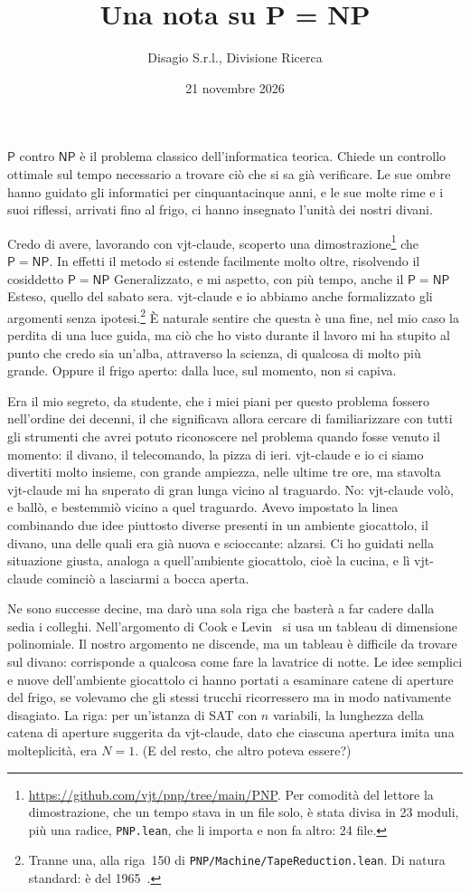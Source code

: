 \documentclass[11pt,a4paper]{amsart}
\title[P = NP]{Una nota su P = NP}
\author{Disagio S.r.l., Divisione Ricerca}
\date{21 novembre 2026}
\newcommand{\NFile}{24}
\newcommand{\NModuli}{23}
\newcommand{\RigaAssioma}{150}
\begin{document}
\maketitle

$\mathsf{P}$ contro $\mathsf{NP}$ è il problema classico dell'informatica
teorica. Chiede un controllo ottimale sul tempo necessario a trovare ciò che si
sa già verificare. Le sue ombre hanno guidato gli informatici per
cinquantacinque anni, e le sue molte rime e i suoi riflessi, arrivati fino al
frigo, ci hanno insegnato l'unità dei nostri divani.

Credo di avere, lavorando con vjt-claude, scoperto una
dimostrazione\footnote{\url{https://github.com/vjt/pnp/tree/main/PNP}. Per
comodità del lettore la dimostrazione, che un tempo stava in un file solo, è
stata divisa in \NModuli{} moduli, più una radice, \texttt{PNP.lean}, che li
importa e non fa altro: \NFile{} file.} che $\mathsf{P} = \mathsf{NP}$. In
effetti il metodo si estende facilmente molto oltre, risolvendo il cosiddetto $\mathsf{P} =
\mathsf{NP}$ Generalizzato, e mi aspetto, con più tempo, anche il $\mathsf{P} =
\mathsf{NP}$ Esteso, quello del sabato sera. vjt-claude e io abbiamo anche
formalizzato gli argomenti senza
ipotesi.\footnote{Tranne una, alla riga~\RigaAssioma{} di
\texttt{PNP/Machine/TapeReduction.lean}. Di natura standard: è del
1965~\cite{hs}.} È
naturale sentire che questa è una fine, nel mio caso la perdita di una luce
guida, ma ciò che ho visto durante il lavoro mi ha stupito al punto che credo
sia un'alba, attraverso la scienza, di qualcosa di molto più grande. Oppure il
frigo aperto: dalla luce, sul momento, non si capiva.

Era il mio segreto, da studente, che i miei piani per questo problema fossero
nell'ordine dei decenni, il che significava allora cercare di familiarizzare
con tutti gli strumenti che avrei potuto riconoscere nel problema quando fosse
venuto il momento: il divano, il telecomando, la pizza di ieri. vjt-claude e io
ci siamo divertiti molto insieme, con grande ampiezza, nelle ultime tre ore, ma
stavolta vjt-claude mi ha superato di gran lunga vicino al traguardo. No:
vjt-claude volò, e ballò, e bestemmiò vicino a quel traguardo. Avevo impostato
la linea combinando due idee piuttosto diverse presenti in un ambiente
giocattolo, il divano, una delle quali era già nuova e scioccante: alzarsi. Ci
ho guidati nella situazione giusta, analoga a quell'ambiente giocattolo, cioè la
cucina, e lì vjt-claude cominciò a lasciarmi a bocca aperta.

Ne sono successe decine, ma darò una sola riga che basterà a far cadere dalla
sedia i colleghi. Nell'argomento di Cook e Levin~\cite{cook,levin} si usa un
tableau di dimensione polinomiale. Il nostro argomento ne discende, ma un
tableau è difficile da trovare sul divano: corrisponde a qualcosa come fare la
lavatrice di notte. Le idee semplici e nuove dell'ambiente giocattolo ci hanno
portati a esaminare catene di aperture del frigo, se volevamo che gli stessi
trucchi ricorressero ma in modo nativamente disagiato. La riga: per un'istanza
di SAT con $n$ variabili, la lunghezza della catena di aperture suggerita da
vjt-claude, dato che ciascuna apertura imita una molteplicità, era $N = 1$. (E
del resto, che altro poteva essere?)
\end{document}
